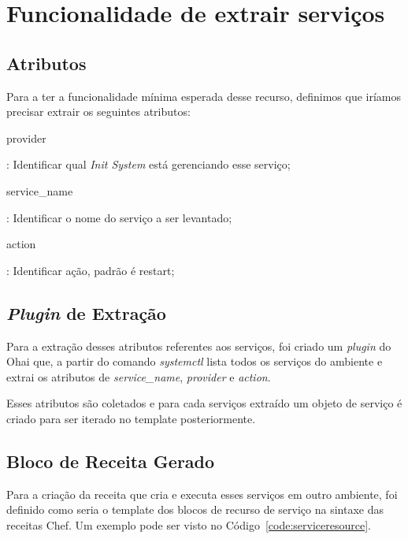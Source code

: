 \section{Funcionalidade de extrair serviços}
\label{sec:services}

\subsection{Atributos}

Para a ter a funcionalidade mínima esperada desse recurso, definimos que iríamos precisar
extrair os seguintes atributos:


\begin{itemize}
    {\itshape\item provider}: Identificar qual \textit{Init System} está gerenciando
esse serviço;
    {\itshape\item service\_name}: Identificar o nome do serviço a
ser levantado;
    {\itshape\item action}: Identificar ação, padrão é restart;
\end{itemize}

\subsection{\textit{Plugin} de Extração}
Para a extração desses atributos referentes aos serviços, foi criado um \textit{plugin} do
Ohai que, a partir do comando \textit{systemctl} lista todos os serviços do ambiente
e extrai os atributos de \textit{service\_name}, \textit{provider}
e \textit{action}.

Esses atributos são coletados e para cada serviços extraído um objeto de serviço
é criado para ser iterado no template posteriormente.

\subsection{Bloco de Receita Gerado}
Para a criação da receita que cria e executa esses serviços em outro ambiente, foi 
definido como seria o template dos blocos de recurso de serviço na sintaxe das 
receitas Chef. Um exemplo pode ser visto no Código~\ref{code:serviceresource}.

\noindent\begin{minipage}{\textwidth}
  \lstset{style=shell}
  
\end{minipage}\hfill

